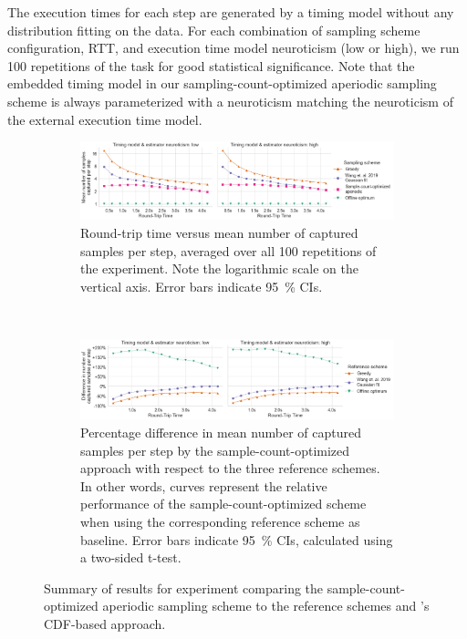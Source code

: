 The execution times for each step are generated by a timing model without any distribution fitting on the data.
For each combination of sampling scheme configuration, \ac{RTT}, and execution time model neuroticism (low or high), we run \num{100} repetitions of the task for good statistical significance.
Note that the embedded timing model in our sampling-count-optimized aperiodic sampling scheme is always parameterized with a neuroticism matching the neuroticism of the external execution time model.

\begin{figure}
    \centering
    \begin{subfigure}[t]{\textwidth}
        \centering
        \includegraphics[width=\textwidth]{figs/new_model/sampling_optimization.png}
        \caption{%
            Round-trip time versus mean number of captured samples per step, averaged over all \num{100} repetitions of the experiment.
            Note the logarithmic scale on the vertical axis.
            Error bars indicate \SI{95}{\percent} \acp{CI}.
        }
    \end{subfigure}\\
    \medskip
    \begin{subfigure}[t]{\textwidth}
        \centering
        \includegraphics[width=\textwidth]{figs/new_model/sampling_optimization_diff.png}
        \caption{%
            Percentage difference in mean number of captured samples per step by the sample-count-optimized approach with respect to the three reference schemes.
            In other words, curves represent the relative performance of the sample-count-optimized scheme when using the corresponding reference scheme as baseline.
            Error bars indicate \SI{95}{\percent} \acp{CI}, calculated using a two-sided t-test.
        }
    \end{subfigure}
    \caption{%
        Summary of results for experiment comparing the sample-count-optimized aperiodic sampling scheme to the reference schemes and \textcite{Wang2019Towards}'s \ac{CDF}-based approach.
    }\label{fig:optimization:samples}
\end{figure}

